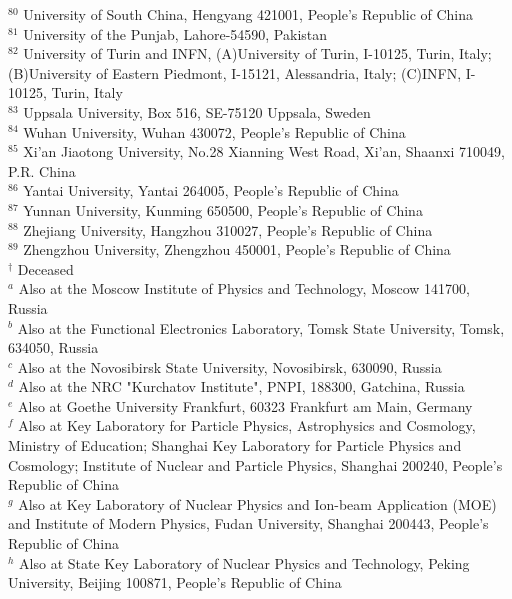 {{$^{80}$ University of South China, Hengyang 421001, People's Republic of China\\
$^{81}$ University of the Punjab, Lahore-54590, Pakistan\\
$^{82}$ University of Turin and INFN, (A)University of Turin, I-10125, Turin, Italy; (B)University of Eastern Piedmont, I-15121, Alessandria, Italy; (C)INFN, I-10125, Turin, Italy\\
$^{83}$ Uppsala University, Box 516, SE-75120 Uppsala, Sweden\\
$^{84}$ Wuhan University, Wuhan 430072, People's Republic of China\\
$^{85}$ Xi'an Jiaotong University, No.28 Xianning West Road, Xi'an, Shaanxi 710049, P.R. China\\
$^{86}$ Yantai University, Yantai 264005, People's Republic of China\\
$^{87}$ Yunnan University, Kunming 650500, People's Republic of China\\
$^{88}$ Zhejiang University, Hangzhou 310027, People's Republic of China\\
$^{89}$ Zhengzhou University, Zhengzhou 450001, People's Republic of China\\
\vspace{0.2cm}
$^{\dagger}$ Deceased\\
$^{a}$ Also at the Moscow Institute of Physics and Technology, Moscow 141700, Russia\\
$^{b}$ Also at the Functional Electronics Laboratory, Tomsk State University, Tomsk, 634050, Russia\\
$^{c}$ Also at the Novosibirsk State University, Novosibirsk, 630090, Russia\\
$^{d}$ Also at the NRC "Kurchatov Institute", PNPI, 188300, Gatchina, Russia\\
$^{e}$ Also at Goethe University Frankfurt, 60323 Frankfurt am Main, Germany\\
$^{f}$ Also at Key Laboratory for Particle Physics, Astrophysics and Cosmology, Ministry of Education; Shanghai Key Laboratory for Particle Physics and Cosmology; Institute of Nuclear and Particle Physics, Shanghai 200240, People's Republic of China\\
$^{g}$ Also at Key Laboratory of Nuclear Physics and Ion-beam Application (MOE) and Institute of Modern Physics, Fudan University, Shanghai 200443, People's Republic of China\\
$^{h}$ Also at State Key Laboratory of Nuclear Physics and Technology, Peking University, Beijing 100871, People's Republic of China\\
}}
